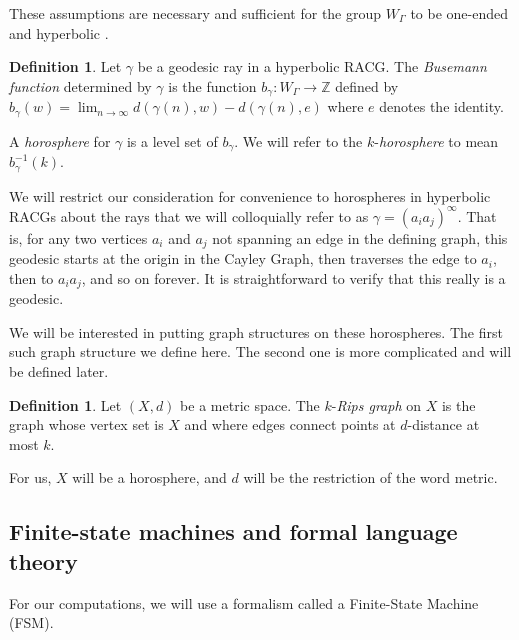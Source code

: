 \documentclass{amsart}
\newcommand{\Z}{\mathbb{Z}}
\theoremstyle{definition}
\newtheorem{definition}[theorem]{Definition}
\theoremstyle{remark}
\begin{document}
	
	
	These assumptions are necessary and sufficient for the group $W_\Gamma$ to be one-ended and hyperbolic \cite{Davis}.
	
	\begin{definition}
		
		Let $\gamma$ be a geodesic ray in a hyperbolic RACG. The \textit{Busemann function} determined by $\gamma$ is the function $b_\gamma:W_\Gamma\to \Z$ defined by $b_\gamma(w)=\lim_{n\to\infty} d(\gamma(n), w)-d(\gamma(n), e)$ where $e$ denotes the identity.
		
		A \textit{horosphere} for $\gamma$ is a level set of $b_\gamma$. We will refer to the $k$-\textit{horosphere} to mean $b_\gamma^{-1}(k)$.
		
	\end{definition}
	
	We will restrict our consideration for convenience to horospheres in hyperbolic RACGs about the rays that we will colloquially refer to as $\gamma = (a_ia_j)^\infty$. That is, for any two vertices $a_i$ and $a_j$ not spanning an edge in the defining graph, this geodesic starts at the origin in the Cayley Graph, then traverses the edge to $a_i$, then to $a_ia_j$, and so on forever. It is straightforward to verify that this really is a geodesic.
	
	We will be interested in putting graph structures on these horospheres. The first such graph structure we define here. The second one is more complicated and will be defined later.
	
	\begin{definition}
		
		Let $(X,d)$ be a metric space. The $k$-\textit{Rips graph} on $X$ is the graph whose vertex set is $X$ and where edges connect points at $d$-distance at most $k$.
		
	\end{definition}
	
	For us, $X$ will be a horosphere, and $d$ will be the restriction of the word metric.

        \subsection*{Finite-state machines and formal language theory}
	
	For our computations, we will use a formalism called a Finite-State Machine (FSM).
	
\end{document}
